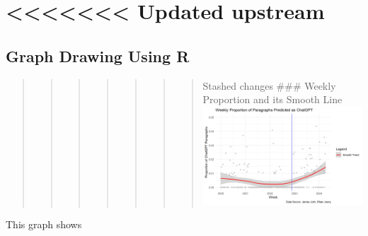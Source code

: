 \documentclass[
]{article}
\begin{document}
\section{\textless\textless\textless\textless\textless\textless\textless{}
Updated upstream}\label{updated-upstream}

\subsection{Graph Drawing Using R}\label{graph-drawing-using-r}

\begin{quote}
\begin{quote}
\begin{quote}
\begin{quote}
\begin{quote}
\begin{quote}
\begin{quote}
Stashed changes \#\#\# Weekly Proportion and its Smooth Line
\includegraphics[width=0.5\linewidth,height=\textheight,keepaspectratio]{images/weekly_smooth.png}
\end{quote}
\end{quote}
\end{quote}
\end{quote}
\end{quote}
\end{quote}
\end{quote}

This graph shows
\end{document}
